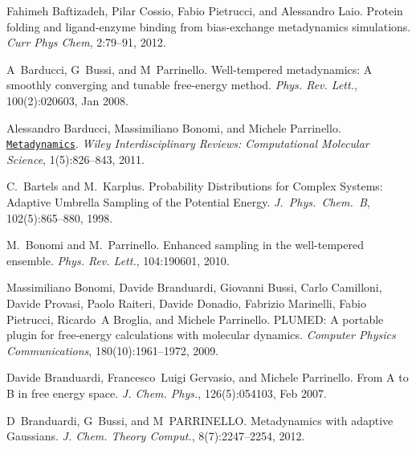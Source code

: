 
\begin{DoxyDescription}
\item[\label{_CITEREF_baftizadeh2012protein}%
\mbox{[}1\mbox{]}]Fahimeh Baftizadeh, Pilar Cossio, Fabio Pietrucci, and Alessandro Laio. Protein folding and ligand-\/enzyme binding from bias-\/exchange metadynamics simulations. {\itshape Curr Phys Chem}, 2\+:79--91, 2012.


\item[\label{_CITEREF_Barducci:2008}%
\mbox{[}2\mbox{]}]A~Barducci, G~Bussi, and M~Parrinello. Well-\/tempered metadynamics\+: A smoothly converging and tunable free-\/energy method. {\itshape Phys. Rev. Lett.}, 100(2)\+:020603, Jan 2008.


\item[\label{_CITEREF_WCMS:WCMS31}%
\mbox{[}3\mbox{]}]Alessandro Barducci, Massimiliano Bonomi, and Michele Parrinello. \href{http://dx.doi.org/10.1002/wcms.31}{\tt Metadynamics}. {\itshape Wiley Interdisciplinary Reviews\+: Computational Molecular Science}, 1(5)\+:826--843, 2011. 


\item[\label{_CITEREF_bart-karp98jpcb}%
\mbox{[}4\mbox{]}]C.~Bartels and M.~Karplus. Probability Distributions for Complex Systems\+: Adaptive Umbrella Sampling of the Potential Energy. {\itshape J.~Phys.~Chem.~B}, 102(5)\+:865--880, 1998.


\item[\label{_CITEREF_Bonomi:2009p17935}%
\mbox{[}5\mbox{]}]M.~Bonomi and M.~Parrinello. Enhanced sampling in the well-\/tempered ensemble. {\itshape Phys. Rev. Lett.}, 104\+:190601, 2010.


\item[\label{_CITEREF_plumed1}%
\mbox{[}6\mbox{]}]Massimiliano Bonomi, Davide Branduardi, Giovanni Bussi, Carlo Camilloni, Davide Provasi, Paolo Raiteri, Davide Donadio, Fabrizio Marinelli, Fabio Pietrucci, Ricardo~A Broglia, and Michele Parrinello. P\+L\+U\+M\+E\+D\+: A portable plugin for free-\/energy calculations with molecular dynamics. {\itshape Computer Physics Communications}, 180(10)\+:1961--1972, 2009.


\item[\label{_CITEREF_brand07}%
\mbox{[}7\mbox{]}]Davide Branduardi, Francesco~Luigi Gervasio, and Michele Parrinello. From A to B in free energy space. {\itshape J. Chem. Phys.}, 126(5)\+:054103, Feb 2007.


\item[\label{_CITEREF_Branduardi:2012dl}%
\mbox{[}8\mbox{]}]D~Branduardi, G~Bussi, and M~P\+A\+R\+R\+I\+N\+E\+L\+L\+O. Metadynamics with adaptive Gaussians. {\itshape J. Chem. Theory Comput.}, 8(7)\+:2247--2254, 2012.



\end{DoxyDescription}
